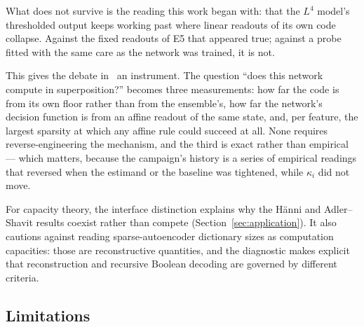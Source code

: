 \documentclass[preprint,12pt]{elsarticle}
\theoremstyle{definition}
\begin{document}
What does not survive is the reading this work began with: that the $L^4$ model's thresholded output
keeps working past where linear readouts of its own code collapse. Against the fixed readouts of E5
that appeared true; against a probe fitted with the same care as the network was trained, it is not.

This gives the debate in~\cite{bhagat2026cc,ferreiradasilva2026l4} an instrument. The question
``does this network compute in superposition?'' becomes three measurements: how far the code is from
its own floor rather than from the ensemble's, how far the network's decision function is from an
affine readout of the same state, and, per feature, the largest sparsity at which any affine rule
could succeed at all. None requires reverse-engineering the mechanism, and the third is exact rather
than empirical --- which matters, because the campaign's history is a series of empirical readings
that reversed when the estimand or the baseline was tightened, while $\kappa_i$ did not move.

For capacity theory, the interface distinction explains why the H\"{a}nni and Adler--Shavit
results coexist rather than compete (Section~\ref{sec:application}). It also cautions against
reading sparse-autoencoder dictionary sizes as computation capacities: those are reconstructive
quantities, and the diagnostic makes explicit that reconstruction and recursive Boolean
decoding are governed by different criteria.

\subsection{Limitations}
\label{sec:limitations}
\end{document}
